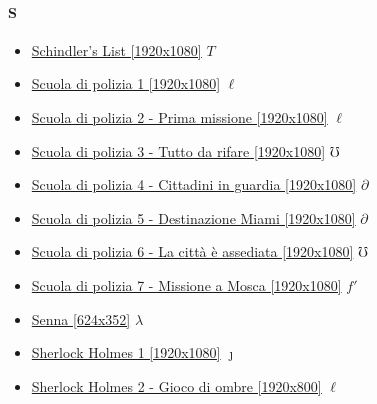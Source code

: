 	\paragraph{S} \hypertarget{FIS}{}
		\begin{itemize}
			
			\item \href{https://mega.nz/#!k2gGgDpB!R1mRfKLmrHkq4D30LkVxX6iuCZ-Qnql-hluMtDDnhNM} {Schindler's List [1920x1080]}  $T$ \\ 
			\item \href{https://mega.nz/#!zLg0SbgB!C2vLX4XZ8jcBCOEvwuzdicR2lM-wbTm_ayW0mXOO3O8} {Scuola di polizia 1 [1920x1080]}  $\ell$ \\ 
			\item \href{https://mega.nz/#!XHoSHKzC!LHNjOWIOqbOxwZGwAc2QVCmvuCz8dfZWVggDhUryrcM} {Scuola di polizia 2 - Prima missione [1920x1080]}  $\ell$ \\ 
			\item \href{https://mega.nz/#!rzImURxR!DBsKMVxoSfEc0rO94hfkxDdbgD6SQGgdwka8MD6Wad8} {Scuola di polizia 3 - Tutto da rifare [1920x1080]}  $\mho$ \\ 
			\item \href{https://mega.nz/#!zTAFTKJS!vuoWY6IMlBvUb3-xw8GfHAfVcCbFoMiAN-dapErlprg} {Scuola di polizia 4 - Cittadini in guardia [1920x1080]}  $\partial$ \\ 
			\item \href{https://mega.nz/#!SKhkDCDA!5QERrPGDuYdWLpsHPRU09CUAzOSFA118IoRCiP_XZH0} {Scuola di polizia 5 - Destinazione Miami [1920x1080]}  $\partial$ \\ 
			\item \href{https://mega.nz/#!iuJBSA7T!RVxowTpXBC02ApIuOpoDyRNatuVexgz5EuqlM7ZC_60} {Scuola di polizia 6 - La città è assediata [1920x1080]}  $\mho$ \\ 
			\item \href{https://mega.nz/#!m2B2kZRA!AqafChVP9ohAoSU90rjsYGMEWOOKHwiqSzQwsJpxaV8} {Scuola di polizia 7 - Missione a Mosca [1920x1080]}  $f'$ \\ 
			\item \href{https://mega.nz/#!algW3SQD!nNL1PL6c45bRyHvzbRT1UU_hyEpw1RXp28n_L4X3Mq4} {Senna [624x352]}  $\lambda$ \\ 
			\item \href{https://mega.nz/#!T7QGWZJb!NWC5s8Em9b5X681IECFM9_Bj3JSEBXeA8dV_6IuBgjw} {Sherlock Holmes 1 [1920x1080]}  $\jmath$ \\
			\item \href{https://mega.nz/#!LDRXABzZ!SgIZ9Ocg2Zcb7ea6vEZp_oDm8GBfMcypM0g0n98DapI} {Sherlock Holmes 2 - Gioco di ombre [1920x800]}  $\ell$ \\

\end{itemize}
